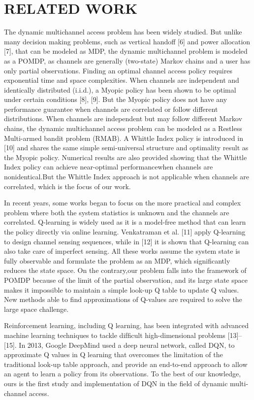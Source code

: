 \section{  RELATED WORK  }
The dynamic multichannel access problem has been widely studied. But unlike many decision making problems, such as vertical handoff [6] and power allocation [7], that can
be modeled as MDP, the dynamic multichannel problem is modeled as a POMDP, as channels are generally (two-state) Markov chains and a user has only partial observations. Finding an optimal channel access policy requires exponential time and space complexities. When channels are independent and identically distributed (i.i.d.), a Myopic policy has been shown to be optimal under certain conditions [8], [9]. But the Myopic policy does not have any performance guarantee when channels are correlated or follow different distributions. When channels are independent but may follow different Markov chains, the dynamic multichannel access problem can be modeled as a Restless Multi-armed bandit problem (RMAB). A Whittle Index policy is introduced in [10] and shares the same simple semi-universal structure and optimality result as the Myopic policy. Numerical results are also provided showing that the Whittle Index policy can achieve near-optimal performancewhen channels are nonidentical.But the Whittle Index approach is not applicable when channels are correlated, which is the focus of our work. 

In recent years, some works began to focus on the more practical and complex problem where both the system statistics is unknown and the channels are correlated. Q-learning is widely used as it is a model-free method that can learn the policy directly via online learning. Venkatraman et al. [11] apply Q-learning to design channel sensing sequences, while in [12] it is shown that Q-learning can also take care of imperfect sensing. All these works assume the system state is fully observable and formulate the problem as an MDP, which signiﬁcantly reduces the state space. On the contrary,our problem falls into the framework of POMDP because of the limit of the partial observation, and its large state space makes it impossible to maintain a simple look-up Q table to update Q values. New methods able to ﬁnd approximations of Q-values are required to solve the large space challenge. 

Reinforcement learning, including Q learning, has been integrated with advanced machine learning techniques to tackle difﬁcult high-dimensional problems [13]–[15]. In 2013, Google DeepMind used a deep neural network, called DQN, to approximate Q values in Q learning that overcomes the limitation of the traditional look-up table approach, and provide an end-to-end approach to allow an agent to learn a policy from its observations. To the best of our knowledge, ours is the ﬁrst study and implementation of DQN in the ﬁeld of dynamic multi-channel access.

